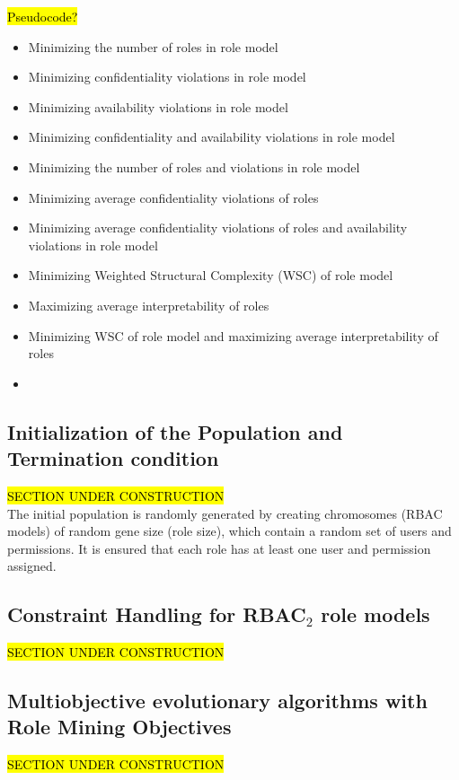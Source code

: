     \hl{Pseudocode?}
    \begin{itemize}
        \item{Minimizing the number of roles in role model}
        \item{Minimizing confidentiality violations in role model}
        \item{Minimizing availability violations in role model}
        \item{Minimizing confidentiality and availability violations in role model}
        \item{Minimizing the number of roles and violations in role model}
        \item{Minimizing average confidentiality violations of roles}
        \item{Minimizing average confidentiality violations of roles and availability violations in role model}
        \item{Minimizing Weighted Structural Complexity (WSC) of role model}
        \item{Maximizing average interpretability of roles}
        \item{Minimizing WSC of role model and maximizing average interpretability of roles}
        \item 
    \end{itemize}
    
    \subsection{Initialization of the Population and Termination condition}
    \hl{SECTION UNDER CONSTRUCTION}\\
    The initial population is randomly generated by creating chromosomes (RBAC models) of random gene size (role size), which contain a random set of users and permissions. It is ensured that each role has at least one user and permission assigned.
    
    \subsection{Constraint Handling for RBAC$_2$ role models}
    \hl{SECTION UNDER CONSTRUCTION}\\
    
    \subsection{Multiobjective evolutionary algorithms with Role Mining Objectives}
    \hl{SECTION UNDER CONSTRUCTION}\\
